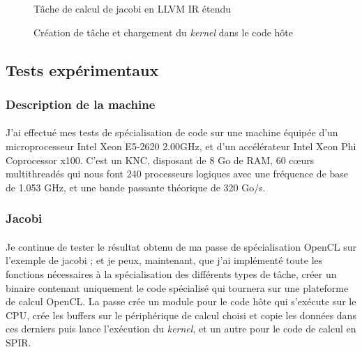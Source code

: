 \begin{figure}[]
   
   \caption{Tâche de calcul de jacobi en LLVM IR étendu}
   \label{calc_jacobi}
\end{figure}

\begin{figure}[]
   
   \caption{Création de tâche et chargement du \emph{kernel} dans le code hôte}
   \label{jacobi_task_create}
\end{figure}
\clearpage

\subsection{Tests expérimentaux}
\subsubsection{Description de la machine}
\paragraph{}
J'ai effectué mes tests de spécialisation de code sur une machine équipée d'un
microprocesseur Intel Xeon E5-2620 2.00GHz, et d'un accélérateur Intel Xeon Phi
Coprocessor x100. C'est un KNC, disposant de 8 Go de RAM, 60 c\oe{}urs
multithreadés qui nous font 240 processeurs logiques avec une fréquence de base
de 1.053 GHz, et une bande passante théorique de 320 Go/s.

\subsubsection{Jacobi}
\paragraph{}
Je continue de tester le résultat obtenu de ma passe de spécialisation OpenCL
sur l'exemple de jacobi ; et je peux, maintenant, que j'ai implémenté toute les
fonctions nécessaires à la spécialisation des différents types de tâche, créer
un binaire contenant uniquement le code spécialisé qui tournera sur une
plateforme de calcul OpenCL. La passe crée un module pour le code hôte qui
s'exécute sur le CPU, crée les buffers sur le périphérique de calcul choisi et
copie les données dans ces derniers puis lance l'exécution du \emph{kernel}, et
un autre pour le code de calcul en SPIR.


